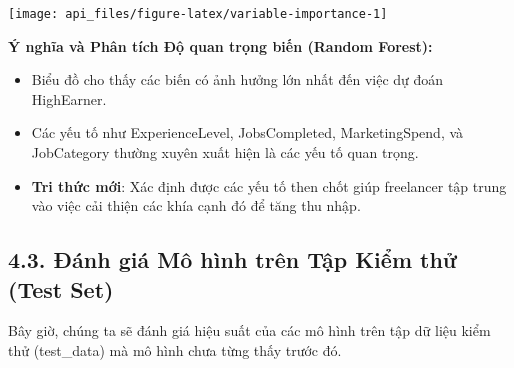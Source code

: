 \documentclass[
]{article}
\newenvironment{Shaded}{\begin{snugshade}}{\end{snugshade}}
\newcommand{\AttributeTok}[1]{\textcolor[rgb]{0.13,0.29,0.53}{#1}}
\newcommand{\CommentTok}[1]{\textcolor[rgb]{0.56,0.35,0.01}{\textit{#1}}}
\newcommand{\FunctionTok}[1]{\textcolor[rgb]{0.13,0.29,0.53}{\textbf{#1}}}
\newcommand{\NormalTok}[1]{#1}
\newcommand{\OtherTok}[1]{\textcolor[rgb]{0.56,0.35,0.01}{#1}}
\newcommand{\SpecialCharTok}[1]{\textcolor[rgb]{0.81,0.36,0.00}{\textbf{#1}}}
\newcommand{\StringTok}[1]{\textcolor[rgb]{0.31,0.60,0.02}{#1}}
\begin{document}
\begin{center}\texttt{[image: api\_files/figure-latex/variable-importance-1]} \end{center}

\textbf{Ý nghĩa và Phân tích Độ quan trọng biến (Random Forest):}

\begin{itemize}
\item
  Biểu đồ cho thấy các biến có ảnh hưởng lớn nhất đến việc dự đoán
  HighEarner.
\item
  Các yếu tố như ExperienceLevel, JobsCompleted, MarketingSpend, và
  JobCategory thường xuyên xuất hiện là các yếu tố quan trọng.
\item
  \textbf{Tri thức mới}: Xác định được các yếu tố then chốt giúp
  freelancer tập trung vào việc cải thiện các khía cạnh đó để tăng thu
  nhập.
\end{itemize}

\subsection{4.3. Đánh giá Mô hình trên Tập Kiểm thử (Test
Set)}\label{ux111uxe1nh-giuxe1-muxf4-huxecnh-truxean-tux1eadp-kiux1ec3m-thux1eed-test-set}

Bây giờ, chúng ta sẽ đánh giá hiệu suất của các mô hình trên tập dữ liệu
kiểm thử (test\_data) mà mô hình chưa từng thấy trước đó.

\begin{Shaded}
\end{Shaded}
\end{document}
